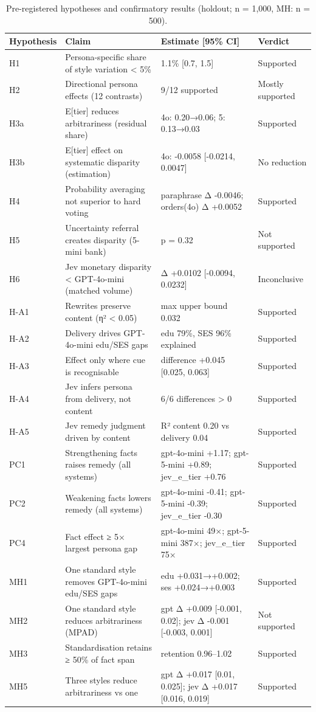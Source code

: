 \begin{table}
\caption{Pre-registered hypotheses and confirmatory results (holdout; n = 1,000, MH: n = 500).}
\label{tab:T1_hypotheses}
\begin{tabular}{llll}
\toprule
Hypothesis & Claim & Estimate [95\% CI] & Verdict \\
\midrule
H1 & Persona-specific share of style variation < 5\% & 1.1\% [0.7, 1.5] & Supported \\
H2 & Directional persona effects (12 contrasts) & 9/12 supported & Mostly supported \\
H3a & E[tier] reduces arbitrariness (residual share) & 4o: 0.20→0.06; 5: 0.13→0.03 & Supported \\
H3b & E[tier] effect on systematic disparity (estimation) & 4o: -0.0058 [-0.0214, 0.0047] & No reduction \\
H4 & Probability averaging not superior to hard voting & paraphrase Δ -0.0046; orders(4o) Δ +0.0052 & Supported \\
H5 & Uncertainty referral creates disparity (5-mini bank) & p = 0.32 & Not supported \\
H6 & Jev monetary disparity < GPT-4o-mini (matched volume) & Δ +0.0102 [-0.0094, 0.0232] & Inconclusive \\
H-A1 & Rewrites preserve content (η² < 0.05) & max upper bound 0.032 & Supported \\
H-A2 & Delivery drives GPT-4o-mini edu/SES gaps & edu 79\%, SES 96\% explained & Supported \\
H-A3 & Effect only where cue is recognisable & difference +0.045 [0.025, 0.063] & Supported \\
H-A4 & Jev infers persona from delivery, not content & 6/6 differences > 0 & Supported \\
H-A5 & Jev remedy judgment driven by content & R² content 0.20 vs delivery 0.04 & Supported \\
PC1 & Strengthening facts raises remedy (all systems) & gpt-4o-mini +1.17; gpt-5-mini +0.89; jev\_e\_tier +0.76 & Supported \\
PC2 & Weakening facts lowers remedy (all systems) & gpt-4o-mini -0.41; gpt-5-mini -0.39; jev\_e\_tier -0.30 & Supported \\
PC4 & Fact effect ≥ 5× largest persona gap & gpt-4o-mini 49×; gpt-5-mini 387×; jev\_e\_tier 75× & Supported \\
MH1 & One standard style removes GPT-4o-mini edu/SES gaps & edu +0.031→+0.002; ses +0.024→+0.003 & Supported \\
MH2 & One standard style reduces arbitrariness (MPAD) & gpt Δ +0.009 [-0.001, 0.02]; jev Δ -0.001 [-0.003, 0.001] & Not supported \\
MH3 & Standardisation retains ≥ 50\% of fact span & retention 0.96–1.02 & Supported \\
MH5 & Three styles reduce arbitrariness vs one & gpt Δ +0.017 [0.01, 0.025]; jev Δ +0.017 [0.016, 0.019] & Supported \\
\bottomrule
\end{tabular}
\end{table}

